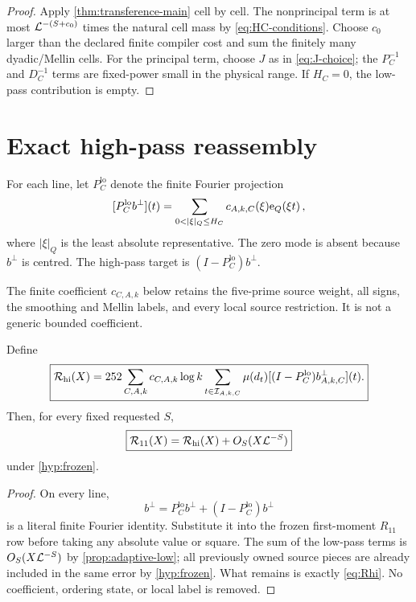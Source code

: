 \begin{proof}
Apply \cref{thm:transference-main} cell by cell.  The nonprincipal term is at
most $\mathcal L^{-(S+c_0)}$ times the natural cell mass by
\cref{eq:HC-conditions}.  Choose $c_0$ larger than the declared finite
compiler cost and sum the finitely many dyadic/Mellin cells.  For the principal
term, choose $J$ as in \cref{eq:J-choice}; the $P_C^{-1}$ and $D_C^{-1}$ terms
are fixed-power small in the physical range.  If $H_C=0$, the low-pass
contribution is empty.
\end{proof}

\section{Exact high-pass reassembly}\label{sec:reassembly}

For each line, let $P_C^{\mathrm{lo}}$ denote the finite Fourier projection
\begin{equation}\label{eq:Plo}
  [P_C^{\mathrm{lo}}b^\perp](t)
   =\sum_{0<|\xi|_Q\le H_C}c_{A,k,C}(\xi)\eord{Q}{\xi t},
\end{equation}
where $|\xi|_Q$ is the least absolute representative.  The zero mode is absent
because $b^\perp$ is centred.  The high-pass target is
$(I-P_C^{\mathrm{lo}})b^\perp$.

The finite coefficient $c_{C,A,k}$ below retains the five-prime source weight,
all signs, the smoothing and Mellin labels, and every local source restriction.
It is not a generic bounded coefficient.

\begin{theorem}\label{thm:reassembly}
Define
\begin{equation}\label{eq:Rhi}
 \boxed{
 \mathcal R_{\mathrm{hi}}(X)=252\sum_{C,A,k}c_{C,A,k}\log k
   \sum_{t\in\mathcal I_{A,k,C}}\mu(d_t)
      [(I-P_C^{\mathrm{lo}})b^\perp_{A,k,C}](t).
 }
\end{equation}
Then, for every fixed requested $S$,
\begin{equation}\label{eq:R11-Rhi}
 \boxed{
          \mathcal R_{11}(X)=\mathcal R_{\mathrm{hi}}(X)+O_S(X\mathcal L^{-S})
 }
\end{equation}
under \cref{hyp:frozen}.
\end{theorem}

\begin{proof}
On every line,
\[
 b^\perp=P_C^{\mathrm{lo}}b^\perp
            +(I-P_C^{\mathrm{lo}})b^\perp
\]
is a literal finite Fourier identity.  Substitute it into the frozen
first-moment $R_{11}$ row before taking any absolute value or square.  The sum
of the low-pass terms is $O_S(X\mathcal L^{-S})$ by
\cref{prop:adaptive-low}; all previously owned source pieces are already
included in the same error by \cref{hyp:frozen}.  What remains is exactly
\cref{eq:Rhi}.  No coefficient, ordering state, or local label is removed.
\end{proof}

